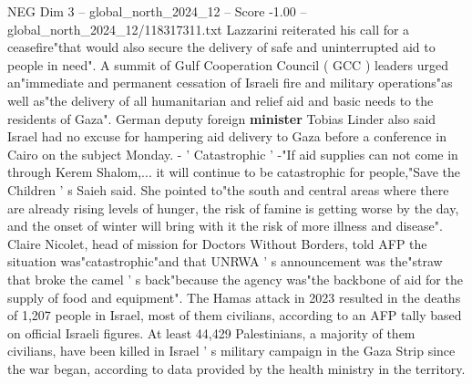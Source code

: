 \begin{textsample}{NEG Dim 3 – global\_north\_2024\_12 – Score -1.00 – global\_north\_2024\_12/118317311.txt}
Lazzarini reiterated his call for a ceasefire"that would also secure the delivery of safe and uninterrupted aid to people in need".
A summit of Gulf Cooperation Council ( GCC ) leaders urged an"immediate and permanent cessation of Israeli fire and military operations"as well as"the delivery of all humanitarian and relief aid and basic needs to the residents of Gaza".
German deputy foreign \textbf{minister} Tobias Linder also said Israel had no excuse for hampering aid delivery to Gaza before a conference in Cairo on the subject Monday. - ' Catastrophic ' -"If aid supplies can not come in through Kerem Shalom,... it will continue to be catastrophic for people,"Save the Children ' s Saieh said.
She pointed to"the south and central areas where there are already rising levels of hunger, the risk of famine is getting worse by the day, and the onset of winter will bring with it the risk of more illness and disease".
Claire Nicolet, head of mission for Doctors Without Borders, told AFP the situation was"catastrophic"and that UNRWA ' s announcement was the"straw that broke the camel ' s back"because the agency was"the backbone of aid for the supply of food and equipment".
The Hamas attack in 2023 resulted in the deaths of 1,207 people in Israel, most of them civilians, according to an AFP tally based on official Israeli figures.
At least 44,429 Palestinians, a majority of them civilians, have been killed in Israel ' s military campaign in the Gaza Strip since the war began, according to data provided by the health ministry in the territory.

\end{textsample}
